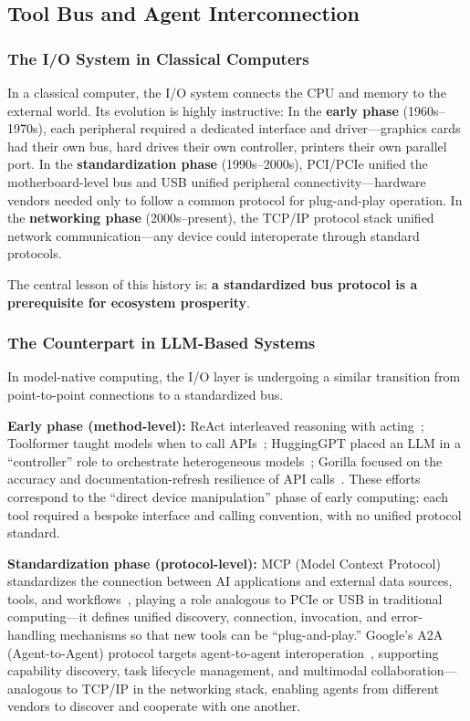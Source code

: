 \documentclass[11pt,a4paper]{article}
\begin{document}
\subsection{Tool Bus and Agent Interconnection}
\label{sec:io}

\subsubsection{The I/O System in Classical Computers}

In a classical computer, the I/O system connects the CPU and memory to the external world.
Its evolution is highly instructive:
In the \textbf{early phase} (1960s--1970s), each peripheral required a dedicated interface and driver---graphics cards had their own bus, hard drives their own controller, printers their own parallel port.
In the \textbf{standardization phase} (1990s--2000s), PCI/PCIe unified the motherboard-level bus and USB unified peripheral connectivity---hardware vendors needed only to follow a common protocol for plug-and-play operation.
In the \textbf{networking phase} (2000s--present), the TCP/IP protocol stack unified network communication---any device could interoperate through standard protocols.

The central lesson of this history is: \textbf{a standardized bus protocol is a prerequisite for ecosystem prosperity}.

\subsubsection{The Counterpart in LLM-Based Systems}

In model-native computing, the I/O layer is undergoing a similar transition from point-to-point connections to a standardized bus.

\textbf{Early phase (method-level):}
ReAct interleaved reasoning with acting~\cite{yao2023react}; Toolformer taught models when to call APIs~\cite{schick2023toolformer}; HuggingGPT placed an LLM in a ``controller'' role to orchestrate heterogeneous models~\cite{hugginggpt2023}; Gorilla focused on the accuracy and documentation-refresh resilience of API calls~\cite{patil2024gorilla}.
These efforts correspond to the ``direct device manipulation'' phase of early computing: each tool required a bespoke interface and calling convention, with no unified protocol standard.

\textbf{Standardization phase (protocol-level):}
MCP (Model Context Protocol) standardizes the connection between AI applications and external data sources, tools, and workflows~\cite{mcp_intro_2026}, playing a role analogous to PCIe or USB in traditional computing---it defines unified discovery, connection, invocation, and error-handling mechanisms so that new tools can be ``plug-and-play.''
Google's A2A (Agent-to-Agent) protocol targets agent-to-agent interoperation~\cite{google_a2a_2025}, supporting capability discovery, task lifecycle management, and multimodal collaboration---analogous to TCP/IP in the networking stack, enabling agents from different vendors to discover and cooperate with one another.
\end{document}
